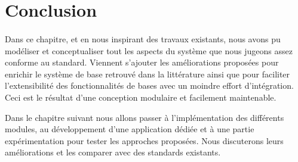 \section{Conclusion}
\paragraph{}
Dans ce chapitre, et en nous inspirant des travaux existants, nous avons pu modéliser et conceptualiser tout les aspects du système que nous jugeons assez conforme au standard. Viennent s'ajouter les améliorations proposées pour enrichir le système de base retrouvé dans la littérature ainsi que pour faciliter l'extensibilité des fonctionnalités de bases avec un moindre effort d'intégration. Ceci est le résultat d'une conception modulaire et facilement maintenable. 
\par Dans le chapitre suivant nous allons passer à l'implémentation des différents modules, au développement d'une application dédiée et à une partie expérimentation pour tester les approches proposées. Nous discuterons leurs améliorations et les comparer avec des standards existants.


